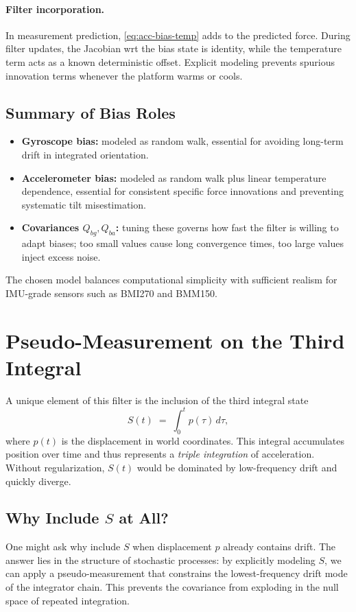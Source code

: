 \documentclass[10pt]{extarticle}
\begin{document}
\paragraph{Filter incorporation.}
In measurement prediction, \eqref{eq:acc-bias-temp} adds to the predicted force. During
filter updates, the Jacobian wrt the bias state is identity, while the temperature term
acts as a known deterministic offset. Explicit modeling prevents spurious innovation
terms whenever the platform warms or cools.

\subsection{Summary of Bias Roles}
\begin{itemize}
\item \textbf{Gyroscope bias:} modeled as random walk, essential for avoiding long-term
drift in integrated orientation.
\item \textbf{Accelerometer bias:} modeled as random walk plus linear temperature
dependence, essential for consistent specific force innovations and preventing systematic
tilt misestimation.
\item \textbf{Covariances $Q_{bg},Q_{ba}$:} tuning these governs how fast the filter
is willing to adapt biases; too small values cause long convergence times, too large values
inject excess noise.
\end{itemize}
The chosen model balances computational simplicity with sufficient realism for IMU-grade
sensors such as BMI270 and BMM150.


\section{Pseudo-Measurement on the Third Integral}
\label{sec:pseudo-S}

A unique element of this filter is the inclusion of the third integral state
\[
S(t) \;=\; \int_0^t p(\tau)\,d\tau,
\]
where $p(t)$ is the displacement in world coordinates.
This integral accumulates position over time and thus represents a 
\emph{triple integration} of acceleration. Without regularization, $S(t)$
would be dominated by low-frequency drift and quickly diverge.

\subsection{Why Include $S$ at All?}
One might ask why include $S$ when displacement $p$ already contains drift.
The answer lies in the structure of stochastic processes: by explicitly modeling
$S$, we can apply a pseudo-measurement that constrains the lowest-frequency drift
mode of the integrator chain. This prevents the covariance from exploding in the
null space of repeated integration.
\end{document}
